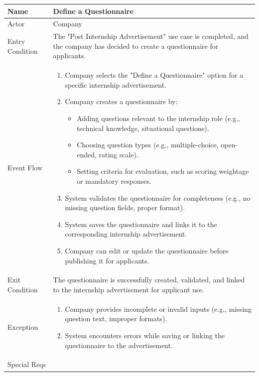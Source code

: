 \begin{table}[H]
\centering
\begin{tabular}{|l|p{12cm}|}
\hline
Name             & Define a Questionnaire \\ \hline
Actor            & Company \\ \hline
Entry Condition  & 
The "Post Internship Advertisement" use case is completed, and the company has decided to create a questionnaire for applicants. \\ \hline
Event Flow       & 
\begin{enumerate}
    \item Company selects the "Define a Questionnaire" option for a specific internship advertisement.
    \item Company creates a questionnaire by:
    \begin{itemize}
        \item Adding questions relevant to the internship role (e.g., technical knowledge, situational questions).
        \item Choosing question types (e.g., multiple-choice, open-ended, rating scale).
        \item Setting criteria for evaluation, such as scoring weightage or mandatory responses.
    \end{itemize}
    \item System validates the questionnaire for completeness (e.g., no missing question fields, proper format).
    \item System saves the questionnaire and links it to the corresponding internship advertisement.
    \item Company can edit or update the questionnaire before publishing it for applicants. 
\end{enumerate} \\ \hline
Exit Condition   & 
The questionnaire is successfully created, validated, and linked to the internship advertisement for applicant use. \\ \hline
Exception        & 
\begin{enumerate}
    \item Company provides incomplete or invalid inputs (e.g., missing question text, improper formats).
    \item System encounters errors while saving or linking the questionnaire to the advertisement.
\end{enumerate} \\ \hline
Special Reqs     & 
\begin{enumerate}

\end{enumerate}
\end{tabular}
\end{table}
